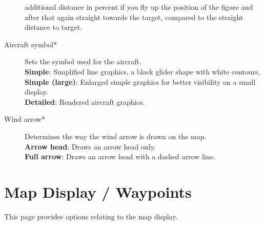 \begin{description}
  additional distance in percent if you fly up the position of the figure and
  after that again straight towards the target, compared to the straight distance
  to target.
\item[Aircraft symbol*]  Sets the symbol used for the aircraft. \\
  {\bf Simple}: Simplified line graphics, a black glider shape with white contours. \\
  {\bf Simple (large)}: Enlarged simple graphics for better visibility on a small display. \\
  {\bf Detailed}: Rendered aircraft graphics.
\item[Wind arrow*]  Determines the way the wind arrow is drawn on the map. \\
  {\bf Arrow head}: Draws an arrow head only. \\
  {\bf Full arrow}: Draws an arrow head with a dashed arrow line.
\end{description}


\section{Map Display / Waypoints}\label{sec:waypoint-display}

This page provides options relating to the map display.

